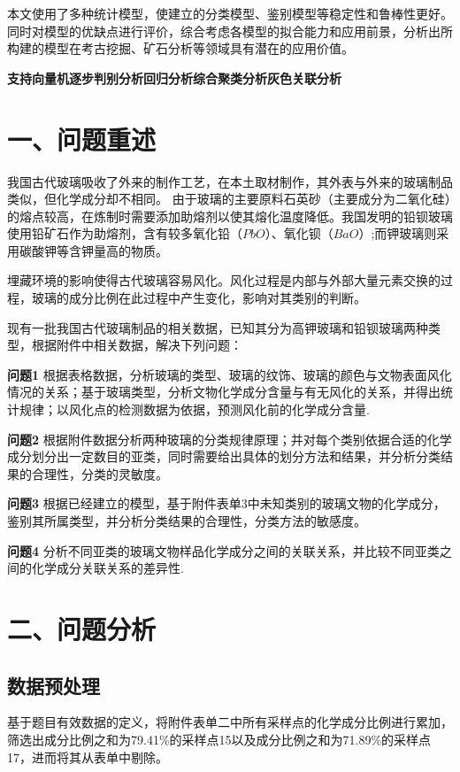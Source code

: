 \documentclass{my_paper}
\begin{document}
本文使用了多种统计模型，使建立的分类模型、鉴别模型等稳定性和鲁棒性更好。同时对模型的优缺点进行评价，综合考虑各模型的拟合能力和应用前景，分析出所构建的模型在考古挖掘、矿石分析等领域具有潜在的应用价值。



\begin{guanjianci}
 \quad \textbf{支持向量机}\quad \textbf{逐步判别分析}\quad \textbf{回归分析}\quad \textbf{综合聚类分析}\quad \textbf{灰色关联分析}
\end{guanjianci}

\newpage
\section{一、问题重述}
我国古代玻璃吸收了外来的制作工艺，在本土取材制作，其外表与外来的玻璃制品类似，但化学成分却不相同。 由于玻璃的主要原料石英砂（主要成分为二氧化硅）的熔点较高，在炼制时需要添加助熔剂以使其熔化温度降低。我国发明的铅钡玻璃使用铅矿石作为助熔剂，含有较多氧化铅（$PbO$）、氧化钡（$BaO$）;而钾玻璃则采用碳酸钾等含钾量高的物质。

埋藏环境的影响使得古代玻璃容易风化。风化过程是内部与外部大量元素交换的过程，玻璃的成分比例在此过程中产生变化，影响对其类别的判断。

现有一批我国古代玻璃制品的相关数据，已知其分为高钾玻璃和铅钡玻璃两种类型，根据附件中相关数据，解决下列问题：

\textbf{问题1} 根据表格数据，分析玻璃的类型、玻璃的纹饰、玻璃的颜色与文物表面风化情况的关系；基于玻璃类型，分析文物化学成分含量与有无风化的关系，并得出统计规律；以风化点的检测数据为依据，预测风化前的化学成分含量.

\textbf{问题2} 根据附件数据分析两种玻璃的分类规律原理；并对每个类别依据合适的化学成分划分出一定数目的亚类，同时需要给出具体的划分方法和结果，并分析分类结果的合理性，分类的灵敏度。

\textbf{问题3} 根据已经建立的模型，基于附件表单3中未知类别的玻璃文物的化学成分，鉴别其所属类型，并分析分类结果的合理性，分类方法的敏感度。
                            
\textbf{问题4} 分析不同亚类的玻璃文物样品化学成分之间的关联关系，并比较不同亚类之间的化学成分关联关系的差异性.

\section{二、问题分析}
\subsection{数据预处理}
基于题目有效数据的定义，将附件表单二中所有采样点的化学成分比例进行累加，筛选出成分比例之和为79.41\%的采样点15以及成分比例之和为71.89\%的采样点17，进而将其从表单中剔除。
\end{document}

